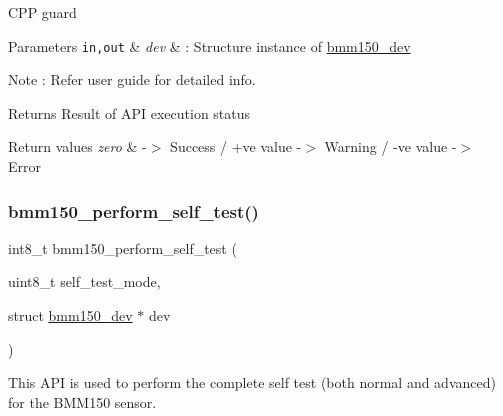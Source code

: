 C\+PP guard


\begin{DoxyParams}[1]{Parameters}
\mbox{\tt in,out}  & {\em dev} & \+: Structure instance of \hyperlink{structbmm150__dev}{bmm150\+\_\+dev} \\
\hline
\end{DoxyParams}
\begin{DoxyNote}{Note}
\+: Refer user guide for detailed info.
\end{DoxyNote}
\begin{DoxyReturn}{Returns}
Result of A\+PI execution status 
\end{DoxyReturn}

\begin{DoxyRetVals}{Return values}
{\em zero} & -\/$>$ Success / +ve value -\/$>$ Warning / -\/ve value -\/$>$ Error \\
\hline
\end{DoxyRetVals}
\mbox{\label{group___b_m_m150_gaabaad6846eae116f278af4c87d432b2f}} 
\subsubsection{\texorpdfstring{bmm150\+\_\+perform\+\_\+self\+\_\+test()}{bmm150\_perform\_self\_test()}}
{\footnotesize\ttfamily int8\+\_\+t bmm150\+\_\+perform\+\_\+self\+\_\+test (\begin{DoxyParamCaption}\item[{uint8\+\_\+t}]{self\+\_\+test\+\_\+mode,  }\item[{struct \hyperlink{structbmm150__dev}{bmm150\+\_\+dev} $\ast$}]{dev }\end{DoxyParamCaption})}



This A\+PI is used to perform the complete self test (both normal and advanced) for the B\+M\+M150 sensor. 


